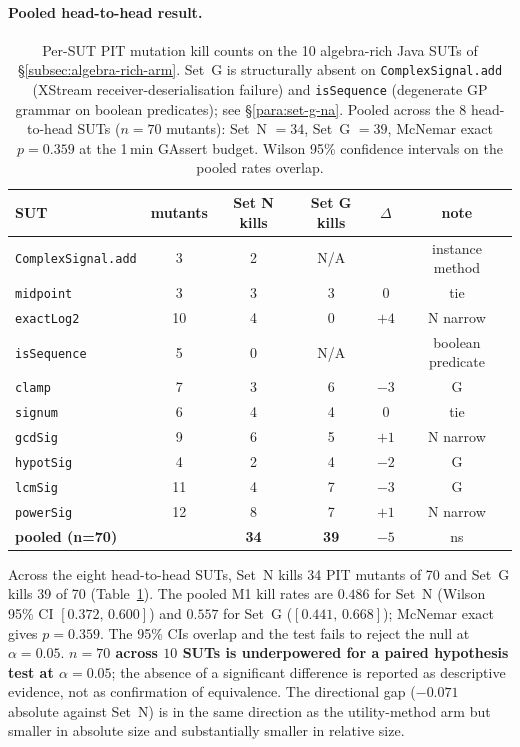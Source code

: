 \paragraph{Pooled head-to-head result.}
\begin{table}[h]
\centering
\caption{Per-SUT PIT mutation kill counts on the 10 algebra-rich Java
SUTs of \S\ref{subsec:algebra-rich-arm}. Set~G is structurally absent
on \texttt{ComplexSignal.add} (XStream receiver-deserialisation
failure) and \texttt{isSequence} (degenerate GP grammar on boolean
predicates); see \S\ref{para:set-g-na}. Pooled across the 8
head-to-head SUTs ($n = 70$ mutants): Set~N $= 34$, Set~G $= 39$,
McNemar exact $p = 0.359$ at the 1\,min GAssert budget. Wilson 95\%
confidence intervals on the pooled rates overlap.}
\label{tab:algebra-rich-pooled}
\small
\begin{tabular}{lccccc}
\toprule
SUT & mutants & Set N kills & Set G kills & $\Delta$ & note \\
\midrule
\texttt{ComplexSignal.add} &  3 & 2 & N/A &      & instance method \\
\texttt{midpoint}          &  3 & 3 & 3   & $0$  & tie \\
\texttt{exactLog2}         & 10 & 4 & 0   & $+4$ & N narrow \\
\texttt{isSequence}        &  5 & 0 & N/A &      & boolean predicate \\
\texttt{clamp}             &  7 & 3 & 6   & $-3$ & G \\
\texttt{signum}            &  6 & 4 & 4   & $0$  & tie \\
\texttt{gcdSig}            &  9 & 6 & 5   & $+1$ & N narrow \\
\texttt{hypotSig}          &  4 & 2 & 4   & $-2$ & G \\
\texttt{lcmSig}            & 11 & 4 & 7   & $-3$ & G \\
\texttt{powerSig}          & 12 & 8 & 7   & $+1$ & N narrow \\
\midrule
\textbf{pooled (n=70)}     &    & \textbf{34} & \textbf{39} & $-5$ & ns \\
\bottomrule
\end{tabular}
\end{table}

Across the eight head-to-head SUTs, Set~N kills 34 PIT mutants of 70
and Set~G kills 39 of 70 (Table~\ref{tab:algebra-rich-pooled}). The
pooled M1 kill rates are $0.486$ for Set~N (Wilson 95\% CI
$[0.372,\,0.600]$) and $0.557$ for Set~G ($[0.441,\,0.668]$); McNemar
exact gives $p = 0.359$. The 95\% CIs overlap and the test fails to
reject the null at $\alpha = 0.05$. \textbf{$n = 70$ across $10$ SUTs
is underpowered for a paired hypothesis test at $\alpha = 0.05$}; the
absence of a significant difference is reported as descriptive
evidence, not as confirmation of equivalence. The directional gap
($-0.071$ absolute against Set~N) is in the same direction as the
utility-method arm but smaller in absolute size and substantially
smaller in relative size.

